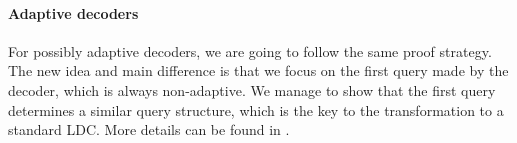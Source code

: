 
\paragraph{Adaptive decoders} For possibly adaptive decoders, we are going to follow the same proof strategy. The new idea and main difference is that we focus on the first query made by the decoder, which is always non-adaptive. We manage to show that the first query determines a similar query structure, which is the key to the transformation to a standard LDC. More details can be found in .

